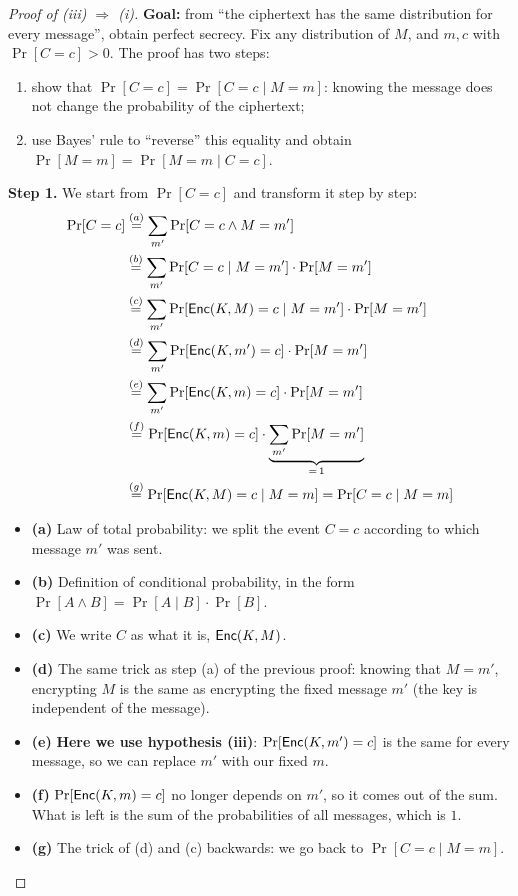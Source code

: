 \begin{proof}[Proof of (iii) $\Rightarrow$ (i)]
  \textbf{Goal:} from ``the ciphertext has the same distribution for every message'', obtain perfect secrecy. Fix any distribution of $M$, and $m, c$ with $\Pr[C = c] > 0$. The proof has two steps:
  \begin{enumerate}
    \item show that $\Pr[C = c] = \Pr[C = c \mid M = m]$: knowing the message does not change the probability of the ciphertext;
    \item use Bayes' rule to ``reverse'' this equality and obtain $\Pr[M = m] = \Pr[M = m \mid C = c]$.
  \end{enumerate}

  \textbf{Step 1.} We start from $\Pr[C = c]$ and transform it step by step:
  \[
    \begin{aligned}
      \Pr[C = c] &\overset{(a)}{=} \sum_{m'} \Pr[C = c \wedge M = m'] \\
      &\overset{(b)}{=} \sum_{m'} \Pr[C = c \mid M = m'] \cdot \Pr[M = m'] \\
      &\overset{(c)}{=} \sum_{m'} \Pr[\mathsf{Enc}(K, M) = c \mid M = m'] \cdot \Pr[M = m'] \\
      &\overset{(d)}{=} \sum_{m'} \Pr[\mathsf{Enc}(K, m') = c] \cdot \Pr[M = m'] \\
      &\overset{(e)}{=} \sum_{m'} \Pr[\mathsf{Enc}(K, m) = c] \cdot \Pr[M = m'] \\
      &\overset{(f)}{=} \Pr[\mathsf{Enc}(K, m) = c] \cdot \underbrace{\sum_{m'} \Pr[M = m']}_{=\,1} \\
      &\overset{(g)}{=} \Pr[\mathsf{Enc}(K, M) = c \mid M = m] = \Pr[C = c \mid M = m]
    \end{aligned}
  \]
  \begin{itemize}
    \item \textbf{(a)} Law of total probability: we split the event $C = c$ according to which message $m'$ was sent.
    \item \textbf{(b)} Definition of conditional probability, in the form $\Pr[A \wedge B] = \Pr[A \mid B] \cdot \Pr[B]$.
    \item \textbf{(c)} We write $C$ as what it is, $\mathsf{Enc}(K, M)$.
    \item \textbf{(d)} The same trick as step (a) of the previous proof: knowing that $M = m'$, encrypting $M$ is the same as encrypting the fixed message $m'$ (the key is independent of the message).
    \item \textbf{(e)} \textbf{Here we use hypothesis (iii)}: $\Pr[\mathsf{Enc}(K, m') = c]$ is the same for every message, so we can replace $m'$ with our fixed $m$.
    \item \textbf{(f)} $\Pr[\mathsf{Enc}(K, m) = c]$ no longer depends on $m'$, so it comes out of the sum. What is left is the sum of the probabilities of all messages, which is $1$.
    \item \textbf{(g)} The trick of (d) and (c) backwards: we go back to $\Pr[C = c \mid M = m]$.
  \end{itemize}


\end{proof}
